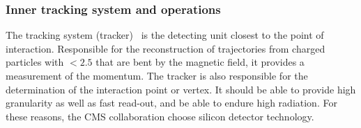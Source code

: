 \subsubsection{Inner tracking system and operations}
\label{sec:TRK}
The tracking system (tracker)~\cite{Chatrchyan:1704291} is the detecting unit closest to the point of interaction. Responsible for the reconstruction of  trajectories from charged particles with \abspsrap $<2.5$ that are bent by the magnetic field, it provides a measurement of the momentum. The tracker is also responsible for the determination of the interaction point or vertex. It should be able to provide high granularity as well as fast read-out, and be able to endure high radiation. For these reasons, the CMS collaboration choose silicon detector technology.

